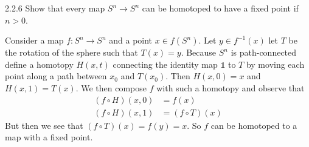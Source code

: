 \documentclass{article}
\begin{document}
\begin{exercise}{2.2.6}{\parindent}
  Show that every map $S^n \to S^n$ can be homotoped to have a fixed
  point if $n > 0$.
\end{exercise}
\begin{solution}{\parindent}
  Consider a map $f: S^n \to S^n$ and a point $x \in f(S^n)$. Let $y
  \in f^{-1}(x)$ let $T$ be the rotation of the sphere such that $T(x)
  = y$. Because $S^n$ is path-connected define a homotopy $H(x,t)$
  connecting the identity map $\mathbb{1}$ to $T$ by moving each point
  along a path between $x_0$ and $T(x_0)$. Then $H(x,0) = x$ and
  $H(x,1) = T(x)$. We then compose $f$ with such a homotopy and
  observe that
  \begin{align*}
    (f\circ H)(x,0) &= f(x) \\
    (f\circ H)(x,1) &= (f\circ T)(x)
  \end{align*}
  But then we see that $(f\circ T)(x) = f(y) = x$. So $f$ can be
  homotoped to a map with a fixed point.
\end{solution}
\end{document}
